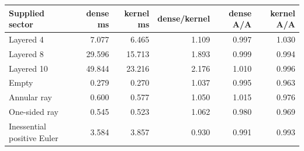 \begin{center}
\small
\begin{tabular}{lrrrrr}
\toprule
Supplied sector & dense ms & kernel ms & dense/kernel & dense A/A & kernel A/A\\
\midrule
Layered 4 & 7.077 & 6.465 & 1.109 & 0.997 & 1.030\\
Layered 8 & 29.596 & 15.713 & 1.893 & 0.999 & 0.994\\
Layered 10 & 49.844 & 23.216 & 2.176 & 1.010 & 0.996\\
Empty & 0.279 & 0.270 & 1.037 & 0.995 & 0.963\\
Annular ray & 0.600 & 0.577 & 1.050 & 1.015 & 0.976\\
One-sided ray & 0.545 & 0.523 & 1.062 & 0.980 & 0.969\\
Inessential positive Euler & 3.584 & 3.857 & 0.930 & 0.991 & 0.993\\
\bottomrule
\end{tabular}
\end{center}
